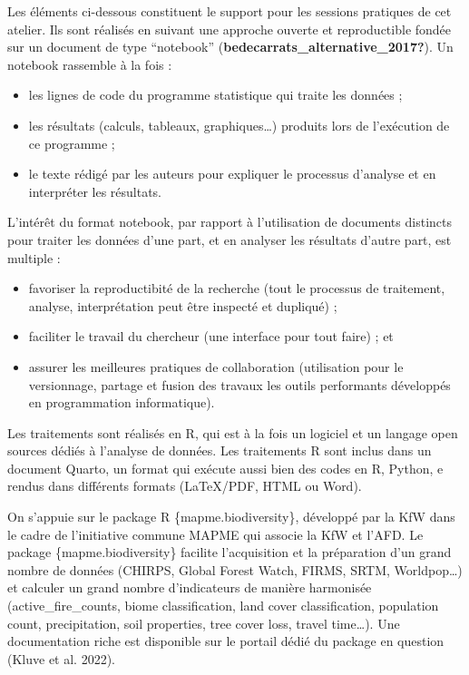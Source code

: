 \documentclass[
  letterpaper,
  DIV=11,
  numbers=noendperiod]{scrreprt}
\begin{document}
Les éléments ci-dessous constituent le support pour les sessions
pratiques de cet atelier. Ils sont réalisés en suivant une approche
ouverte et reproductible fondée sur un document de type ``notebook''
(\textbf{bedecarrats\_alternative\_2017?}). Un notebook rassemble à la
fois :

\begin{itemize}
\item
  les lignes de code du programme statistique qui traite les données ;
\item
  les résultats (calculs, tableaux, graphiques\ldots) produits lors de
  l'exécution de ce programme ;
\item
  le texte rédigé par les auteurs pour expliquer le processus d'analyse
  et en interpréter les résultats.
\end{itemize}

L'intérêt du format notebook, par rapport à l'utilisation de documents
distincts pour traiter les données d'une part, et en analyser les
résultats d'autre part, est multiple :

\begin{itemize}
\item
  favoriser la reproductibité de la recherche (tout le processus de
  traitement, analyse, interprétation peut être inspecté et dupliqué) ;
\item
  faciliter le travail du chercheur (une interface pour tout faire) ; et
\item
  assurer les meilleures pratiques de collaboration (utilisation pour le
  versionnage, partage et fusion des travaux les outils performants
  développés en programmation informatique).
\end{itemize}

Les traitements sont réalisés en R, qui est à la fois un logiciel et un
langage open sources dédiés à l'analyse de données. Les traitements R
sont inclus dans un document Quarto, un format qui exécute aussi bien
des codes en R, Python, e rendus dans différents formats (LaTeX/PDF,
HTML ou Word).

On s'appuie sur le package R \{mapme.biodiversity\}, développé par la
KfW dans le cadre de l'initiative commune MAPME qui associe la KfW et
l'AFD. Le package \{mapme.biodiversity\} facilite l'acquisition et la
préparation d'un grand nombre de données (CHIRPS, Global Forest Watch,
FIRMS, SRTM, Worldpop\ldots) et calculer un grand nombre d'indicateurs
de manière harmonisée (active\_fire\_counts, biome classification, land
cover classification, population count, precipitation, soil properties,
tree cover loss, travel time\ldots). Une documentation riche est
disponible sur le portail dédié du package en question (Kluve et al.
2022).
\end{document}
